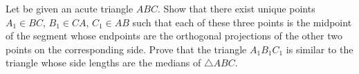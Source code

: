 Let be given an acute triangle $ABC$. Show that there exist unique points $A_1 \in BC$, $B_1 \in CA$, $C_1 \in AB$ such that each of these three points is the midpoint of the segment whose endpoints are the orthogonal projections of the other two points on the corresponding side. Prove that the triangle $A_1B_1C_1$ is similar to the triangle whose side lengths are the medians of $\triangle ABC$.